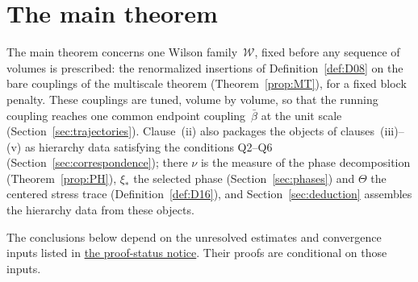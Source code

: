 \section{The main theorem}\label{sec:main-theorem}\label{sec:main-theorems}

The main theorem concerns one Wilson family~$\mathcal W$, fixed before any sequence of volumes is prescribed: the renormalized insertions of Definition~\ref{def:D08} on the bare couplings of the multiscale theorem (Theorem~\ref{prop:MT}), for a fixed block penalty. These couplings are tuned, volume by volume, so that the running coupling reaches one common endpoint coupling~$\bar\beta$ at the unit scale (Section~\ref{sec:trajectories}). Clause~(ii) also packages the objects of clauses~(iii)--(v) as hierarchy data satisfying the conditions Q2--Q6 (Section~\ref{sec:correspondence}); there $\nu$ is the measure of the phase decomposition (Theorem~\ref{prop:PH}), $\xi_*$ the selected phase (Section~\ref{sec:phases}) and $\Theta$ the centered stress trace (Definition~\ref{def:D16}), and Section~\ref{sec:deduction} assembles the hierarchy data from these objects.

The conclusions below depend on the unresolved estimates and convergence inputs listed in \hyperref[par:proof-status]{the proof-status notice}. Their proofs are conditional on those inputs.

